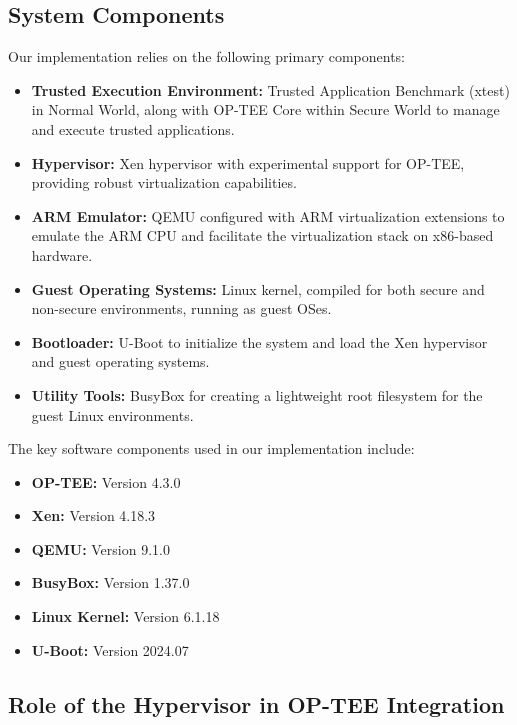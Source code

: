 \documentclass[acmtog]{acmart}
\begin{document}
\subsection{System Components}
Our implementation relies on the following primary components:
\begin{itemize}
  \item \textbf{Trusted Execution Environment:} Trusted Application Benchmark (xtest) in Normal World, along with OP-TEE Core within Secure World to manage and execute trusted applications.
    \item \textbf{Hypervisor:} Xen hypervisor with experimental support for OP-TEE, providing robust virtualization capabilities.
    \item \textbf{ARM Emulator:} QEMU configured with ARM virtualization extensions to emulate the ARM CPU and facilitate the virtualization stack on x86-based hardware.
    \item \textbf{Guest Operating Systems:} Linux kernel, compiled for both secure and non-secure environments, running as guest OSes.
    \item \textbf{Bootloader:} U-Boot to initialize the system and load the Xen hypervisor and guest operating systems.
    \item \textbf{Utility Tools:} BusyBox for creating a lightweight root filesystem for the guest Linux environments.
\end{itemize}


The key software components used in our implementation include: 

\begin{itemize}
  \item \textbf{OP-TEE:} Version 4.3.0

  \item \textbf{Xen:} Version 4.18.3
  \item \textbf{QEMU:} Version 9.1.0

    \item \textbf{BusyBox:} Version 1.37.0
    \item \textbf{Linux Kernel:} Version 6.1.18

    \item \textbf{U-Boot:} Version 2024.07


\end{itemize}



\subsection{Role of the Hypervisor in OP-TEE Integration}
\end{document}
